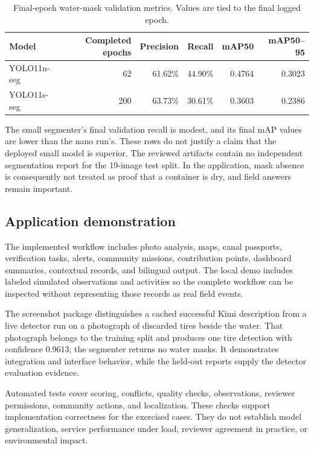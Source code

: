 \documentclass[a4paper,11pt]{article}
\begin{document}
\begin{table}[!htbp]
\centering
\caption{Final-epoch water-mask validation metrics. Values are tied to the final logged epoch.}
\label{tab:5}
\fontsize{9.5}{11.5}\selectfont
\setlength{\tabcolsep}{4.3pt}
\renewcommand{\arraystretch}{1.18}
\begin{tabularx}{\linewidth}{@{}>{\raggedright\arraybackslash}Xrrrrr@{}}
\toprule
\textbf{Model} & \textbf{Completed epochs} & \textbf{Precision} & \textbf{Recall} & \textbf{mAP50} & \textbf{mAP50–95} \\
\midrule
YOLO11n-seg & 62 & 61.62\% & 44.90\% & 0.4764 & 0.3023 \\
YOLO11s-seg & 200 & 63.73\% & 30.61\% & 0.3603 & 0.2386 \\
\bottomrule
\end{tabularx}
\end{table}

The small segmenter's final validation recall is modest, and its final mAP values are lower than the nano run's. These rows do not justify a claim that the deployed small model is superior. The reviewed artifacts contain no independent segmentation report for the 19-image test split. In the application, mask absence is consequently not treated as proof that a container is dry, and field answers remain important.

\subsection{Application demonstration}

The implemented workflow includes photo analysis, maps, canal passports, verification tasks, alerts, community missions, contribution points, dashboard summaries, contextual records, and bilingual output. The local demo includes labeled simulated observations and activities so the complete workflow can be inspected without representing those records as real field events.

The screenshot package distinguishes a cached successful Kimi description from a live detector run on a photograph of discarded tires beside the water. That photograph belongs to the training split and produces one tire detection with confidence 0.9613; the segmenter returns no water masks. It demonstrates integration and interface behavior, while the held-out reports supply the detector evaluation evidence.

Automated tests cover scoring, conflicts, quality checks, observations, reviewer permissions, community actions, and localization. These checks support implementation correctness for the exercised cases. They do not establish model generalization, service performance under load, reviewer agreement in practice, or environmental impact.
\end{document}
